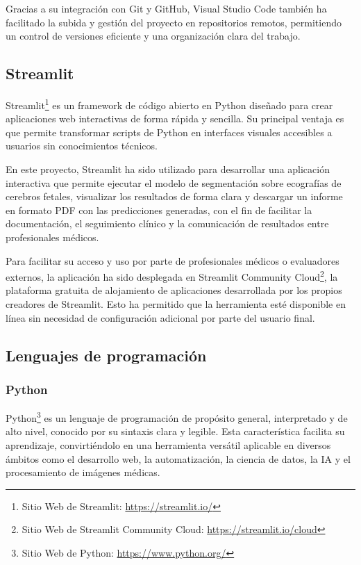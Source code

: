 Gracias a su integración con Git y GitHub, Visual Studio Code también ha facilitado la subida y gestión del proyecto en repositorios remotos, permitiendo un control de versiones eficiente y una organización clara del trabajo. 

\subsection{Streamlit}
Streamlit\footnote{Sitio Web de Streamlit: \url{https://streamlit.io/}} es un framework de código abierto en Python diseñado para crear aplicaciones web interactivas de forma rápida y sencilla. Su principal ventaja es que permite transformar scripts de Python en interfaces visuales accesibles a usuarios sin conocimientos técnicos.

En este proyecto, Streamlit ha sido utilizado para desarrollar una aplicación interactiva que permite ejecutar el modelo de segmentación sobre ecografías de cerebros fetales, visualizar los resultados de forma clara y descargar un informe en formato PDF con las predicciones generadas, con el fin de facilitar la documentación, el seguimiento clínico y la comunicación de resultados entre profesionales médicos.

Para facilitar su acceso y uso por parte de profesionales médicos o evaluadores externos, la aplicación ha sido desplegada en Streamlit Community Cloud\footnote{Sitio Web de Streamlit Community Cloud: \url{https://streamlit.io/cloud}}, la plataforma gratuita de alojamiento de aplicaciones desarrollada por los propios creadores de Streamlit. Esto ha permitido que la herramienta esté disponible en línea sin necesidad de configuración adicional por parte del usuario final.

\subsection{Lenguajes de programación}
\subsubsection{Python}
Python\footnote{Sitio Web de Python: \url{https://www.python.org/}} es un lenguaje de programación de propósito general, interpretado y de alto nivel, conocido por su sintaxis clara y legible. Esta característica facilita su aprendizaje, convirtiéndolo en una herramienta versátil aplicable en diversos ámbitos como el desarrollo web, la automatización, la ciencia de datos, la IA y el procesamiento de imágenes médicas.

